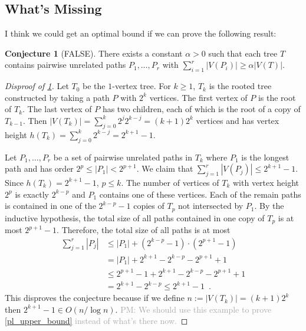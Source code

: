\documentclass[12pt]{article}
\renewcommand{\ge}{\geqslant}
\renewcommand{\le}{\leqslant}
\newcommand{\pat}[1]{\textcolor{DarkGrey}{PM: #1}}
\theoremstyle{plain}
\theoremstyle{definition}
\newtheorem{conj}[thm]{Conjecture}
\begin{document}

\subsection{What's Missing}

I think we could get an optimal bound if we can prove the following result:

\begin{conj}[FALSE]\label{too_bold}
    There exists a constant $\alpha > 0$ such that each tree $T$ contains pairwise unrelated paths $P_1,\ldots,P_r$ with $\sum_{i=1}^r |V(P_i)|\ge \alpha |V(T)|$. 
\end{conj}

\begin{proof}[Disproof of \cref{too_bold}]
    Let $T_0$ be the $1$-vertex tree.  For $k\ge 1$, $T_k$ is the rooted tree constructed by taking a path $P$ with $2^k$ vertices.  The first vertex of $P$ is the root of $T_k$.  The last vertex of $P$ has two children, each of which is the root of a copy of $T_{k-1}$.  Then $|V(T_k)|=\sum_{j=0}^k 2^j 2^{k-j}=(k+1)2^k$ vertices and has vertex height $h(T_k)=\sum_{j=0}^k 2^{k-j}=2^{k+1}-1$.  
    
    Let $P_1,\ldots,P_r$ be a set of pairwise unrelated paths in $T_k$ where $P_1$ is the longest path and has order $2^p\le |P_1|< 2^{p+1}$.  We claim that $\sum_{j=1}^r |V(P_j)|\le 2^{k+1}-1$. Since $h(T_k)=2^{k+1}-1$, $p\le k$.  The number of vertices of $T_k$ with vertex height $2^p$ is exactly $2^{k-p}$ and $P_1$ contains one of these vertices.  Each of the remain paths is contained in one of the $2^{k-p}-1$ copies of $T_{p}$ not intersected by $P_1$.  By the inductive hypothesis, the total size of all paths contained in one copy of $T_p$ is at most $2^{p+1}-1$.  Therefore, the total size of all paths is at most
    \begin{align*}
        \sum_{j=1}^{r}|P_j| 
          & \le |P_1| + (2^{k-p}-1)\cdot (2^{p+1}-1) \\
          & = |P_1| + 2^{k+1} - 2^{k-p} - 2^{p+1}+ 1 \\
          & \le 2^{p+1}-1 + 2^{k+1} - 2^{k-p} - 2^{p+1} + 1 \\
          & = 2^{k+1} - 2^{k-p} \le 2^{k+1}-1 \enspace .
    \end{align*}
    This disproves the conjecture because if we define $n:=|V(T_k)|=(k+1)2^{k}$ then $2^{k+1}-1\in O(n/\log n)$.  \pat{We should use this example to prove \cref{pl_upper_bound} instead of what's there now.}
\end{proof}
\end{document}
